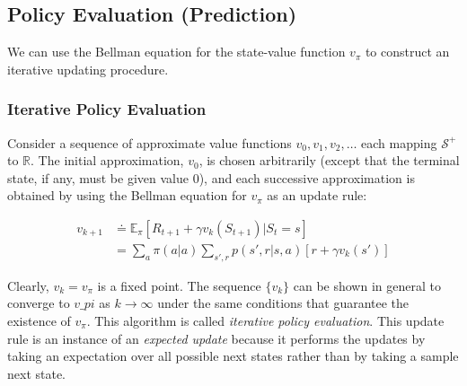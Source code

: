 \documentclass[a4paper, oneside, 11pt]{article}
\newcommand\Epi{\mathbb{E}_\pi}
\begin{document}
\subsection{Policy Evaluation (Prediction)}
We can use the Bellman equation for the state-value function $v_\pi$ to construct an iterative updating procedure.

\subsubsection*{Iterative Policy Evaluation}
Consider a sequence of approximate value functions $v_0, v_1, v_2, \dots$ each mapping $\mathcal{S}^{+}$ to $\mathbb{R}$. The initial approximation, $v_0$, is chosen arbitrarily (except that the terminal state, if any, must be given value $0$), and each successive approximation is obtained by using the Bellman equation for $v_\pi$ as an update rule:

\begin{align}
    v_{k+1} &\doteq \Epi [R_{t+1} + \gamma v_{k}(S_{t+1}) | S_t = s] \\
            &= \sum_a \pi(a|a) \sum_{s', r} p(s', r| s, a) \left[r + \gamma v_k(s')\right]
\end{align}

Clearly, $v_k = v_\pi$ is a fixed point. The sequence $\{v_k\}$ can be shown in general to converge to $v\_pi$ as $k \to \infty$ under the same conditions that guarantee the existence of $v_\pi$. This algorithm is called \emph{iterative policy evaluation}. This update rule is an instance of an \emph{expected update} because it performs the updates by taking an expectation over all possible next states rather than by taking a sample next state.\\
\end{document}
